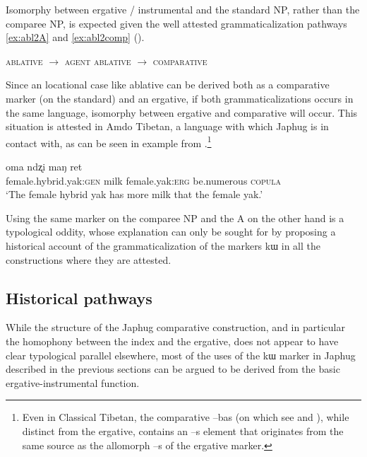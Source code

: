 \documentclass[oldfontcommands,oneside,a4paper,11pt]{article}
\newcommand{\ipa}[1]{{\phon #1}} %
\begin{document}
Isomorphy between ergative / instrumental and the standard NP, rather than the comparee NP, is expected given the well attested grammaticalization pathways \ref{ex:abl2A} and \ref{ex:abl2comp} (\citealt[29]{heine-kuteva02}).
 


\begin{exe}
\ex \label{ex:abl2A}
\glt \textsc{ablative} $\rightarrow$ \textsc{agent} 
\ex \label{ex:abl2comp}
\glt \textsc{ablative} $\rightarrow$ \textsc{comparative}
\end{exe}

Since an locational case like ablative can be derived both as a comparative marker (on the standard) and  an ergative, if both grammaticalizations occurs in the same language, isomorphy between ergative and comparative will occur. This situation is attested in Amdo Tibetan, a language with which Japhug is in contact with, as can be seen in example from \citet[255]{skalbzang02dialectes}.\footnote{Even in Classical Tibetan, the comparative \ipa{--bas} (on which see \citealt{tournadre10cases} and \citealt{hill12bas}), while distinct from the ergative, contains an \ipa{--s}  element that originates from the same source as the allomorph \ipa{--s} of the ergative marker.}

\begin{exe}
\ex \label{ex:vbris}
\gll \ipa{ndzomi}  	\ipa{oma}  	\ipa{ndʐi}  	\ipa{maŋ}  	\ipa{ret}  \\
female.hybrid.yak:\textsc{gen} milk female.yak:\textsc{erg} be.numerous \textsc{copula} \\
\glt `The female hybrid yak has more milk that the female yak.'
\end{exe}

Using the same marker on the comparee NP and the A on the other hand is a typological oddity, whose explanation can only be sought for by proposing a historical account of the grammaticalization of the markers \ipa{kɯ} in all the constructions where they are attested.
 

 
\subsection{Historical pathways}


While the structure of the Japhug comparative construction, and in particular the homophony between the index and the ergative, does not appear to have clear typological parallel elsewhere, most of the uses of the \ipa{kɯ} marker in Japhug described in the previous sections can be argued to be derived from the basic ergative-instrumental function. 
\end{document}

